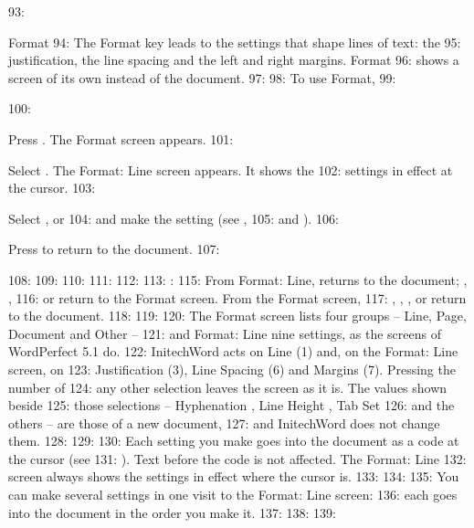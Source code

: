 93: \begin{Feature}{Format}
94: The Format key leads to the settings that shape lines of text: the
95: justification, the line spacing and the left and right margins.  Format
96: shows a screen of its own instead of the document.
97: 
98: To use Format,
99: \begin{WPSteps}
100: \item Press .  The Format screen appears.
101: \item Select .  The Format: Line screen appears.  It shows the
102: settings in effect at the cursor.
103: \item Select ,  or
104:  and make the setting (see ,
105:  and ).
106: \item Press  to return to the document.
107: \end{WPSteps}
108: 
109: 
110: 
111: 
112: 
113: : 
115: From Format: Line,  returns to the document; , ,
116:  or  return to the Format screen.  From the Format screen,
117: , , ,  or  return to the document.
118: 
119: 
120: The Format screen lists four groups -- Line, Page, Document and Other --
121: and Format: Line nine settings, as the screens of WordPerfect 5.1 do.
122: InitechWord acts on Line (1) and, on the Format: Line screen, on
123: Justification (3), Line Spacing (6) and Margins (7).  Pressing the number of
124: any other selection leaves the screen as it is.  The values shown beside
125: those selections -- Hyphenation , Line Height , Tab Set
126:  and the others -- are those of a new document,
127: and InitechWord does not change them.
128: 
129: 
130: Each setting you make goes into the document as a code at the cursor (see
131: ).  Text before the code is not affected.  The Format: Line
132: screen always shows the settings in effect where the cursor is.
133: 
134: 
135: You can make several settings in one visit to the Format: Line screen:
136: each goes into the document in the order you make it.
137: 
138: 
139: \end{Feature}
